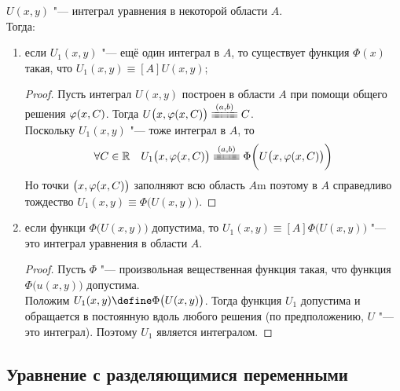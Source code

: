 \begin{theorem}
    $ U(x, y) $ "--- интеграл уравнения  в некоторой области $ A $. \\
    Тогда:
    \begin{enumerate}
    	\item если $ U_1(x, y) $ "--- ещё один интеграл в $ A $, то существует функция $ \Phi(x) $ такая, что $ U_1(x, y) \equiv[A] U(x, y) $;
        \begin{proof}
        	Пусть интеграл $ U(x, y) $ построен в области $ A $ при помощи общего решения $ \varphi(x, C) $. Тогда $ U \big( x, \vphi(x, C) \big) \equiv[(a, b)] C $. \\
            Поскольку $ U_1(x, y) $ "--- тоже интеграл в $ A $, то
            $$ \forall C \in \R \quad U_1 \big( x, \vphi(x, C) \big) \equiv[(a, b)] \Phi \bigg( U \big( x, \vphi(x, C) \big) \bigg) $$
            Но точки $ \big(x, \varphi(x, C) \big) $ заполняют всю область $ A $m поэтому в $ A $ справедливо тождество $ U_1(x, y) \equiv \Phi \big( U(x, y) \big) $.
        \end{proof}
        \item если функци $ \Phi \big( U(x, y) \big) $ допустима, то $ U_1(x, y) \equiv[A] \Phi \big( U(x, y) \big) $ "--- это интеграл уравнения  в области $ A $.
        \begin{proof}
        	Пусть $ \Phi $ "--- произвольная вещественная функция такая, что функция \\
            $ \Phi \big( u(x, y) \big) $ допустима. \\
            Положим $ U_1(x, y) \define \Phi \big( U(x, y) \big) $. Тогда функция $ U_1 $ допустима и обращается в постоянную вдоль любого решения (\as по предположению, $ U $ "--- это интеграл). Поэтому $ U_1 $ является интегралом.
        \end{proof}
    \end{enumerate}
\end{theorem}

\subsection{Уравнение с разделяющимися переменными}

